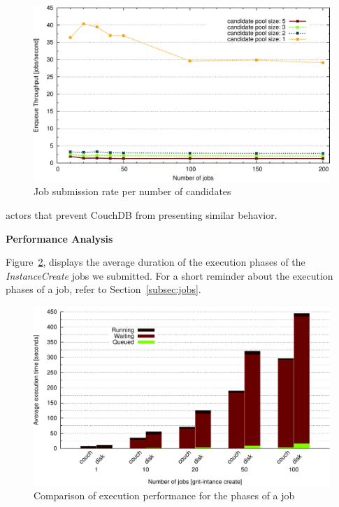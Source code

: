 \begin{figure}[htbp]
  \begin{center}
    \includegraphics[width=1.0\maxwidth]{../figures/mc_comp.pdf}
    \caption{Job submission rate per number of candidates}
    \label{fig:mc_comp}
  \end{center}
\end{figure}

actors that prevent CouchDB from presenting similar behavior.


\bigskip
\newpage
\textbf{Performance Analysis}

Figure~\ref{fig:jobs_avg}, displays the average duration of the execution phases
of the \emph{InstanceCreate} jobs we submitted. For a short reminder about the
execution phases of a job, refer to Section~\ref{subsec:jobs}.

\begin{figure}[htbp]
  \begin{center}
    \includegraphics[width=1.0\maxwidth]{../figures/jobs_avg.pdf}
    \caption{Comparison of execution performance for the phases of a job}
    \label{fig:jobs_avg}
  \end{center}
\end{figure}

